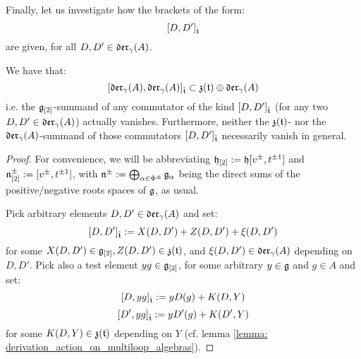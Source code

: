         Finally, let us investigate how the brackets of the form:
            $$[D, D']_{\hat{\mathfrak{t}}}$$
        are given, for all $D, D' \in \mathfrak{der}_{\gamma}(A)$.
        \begin{proposition} \label{prop: lie_bracket_on_orthogonal_complement_of_toroidal_centre}
            We have that:
                $$[ \mathfrak{der}_{\gamma}(A), \mathfrak{der}_{\gamma}(A) ]_{\hat{\mathfrak{t}}} \subset \mathfrak{z}(\mathfrak{t}) \oplus \mathfrak{der}_{\gamma}(A)$$
            i.e. the $\mathfrak{g}_{[2]}$-summand of any commutator of the kind $[D, D']_{\hat{\mathfrak{t}}}$ (for any two $D, D' \in \mathfrak{der}_{\gamma}(A)$) actually vanishes. Furthermore, neither the $\mathfrak{z}(\mathfrak{t})$- nor the $\mathfrak{der}_{\gamma}(A)$-summand of those commutators $[D, D']_{\hat{\mathfrak{t}}}$ necessarily vanish in general. 
        \end{proposition}
            \begin{proof}
                For convenience, we will be abbreviating $\mathfrak{h}_{[2]} := \mathfrak{h}[v^{\pm}, t^{\pm 1}]$ and $\mathfrak{n}^{\pm}_{[2]} := [v^{\pm}, t^{\pm 1}]$, with $\mathfrak{n}^{\pm} := \bigoplus_{\alpha \in \Phi^{\pm}} \mathfrak{g}_{\alpha}$ being the direct sums of the positive/negative roots spaces of $\mathfrak{g}$, as usual.
            
                Pick arbitrary elements $D, D' \in \mathfrak{der}_{\gamma}(A)$ and set:
                    $$[D, D']_{\hat{\mathfrak{t}}} := X(D, D') + Z(D, D') + \xi(D, D')$$
                for some $X(D, D') \in \mathfrak{g}_{[2]}, Z(D, D') \in \mathfrak{z}(\mathfrak{t})$, and $\xi(D, D') \in \mathfrak{der}_{\gamma}(A)$ depending on $D, D'$. Pick also a test element $y g \in \mathfrak{g}_{[2]}$, for some arbitrary $y \in \mathfrak{g}$ and $g \in A$ and set:
                    $$[D, y g]_{\hat{\mathfrak{t}}} := y D( g ) + K(D, Y)$$
                    $$[D', y g]_{\hat{\mathfrak{t}}} := y D'( g ) + K(D', Y)$$
                for some $K(D, Y) \in \mathfrak{z}(\mathfrak{t})$ depending on $Y$ (cf. lemma \ref{lemma: derivation_action_on_multiloop_algebras}).
                

\end{proof}
